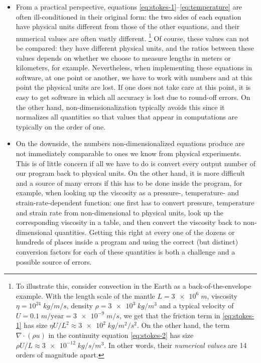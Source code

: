 \documentclass{article}
\begin{document}
\begin{itemize}
  \item From a practical perspective, equations
  \eqref{eq:stokes-1}--\eqref{eq:temperature} are often ill-conditioned in
  their original form: the two sides of each equation have physical units
  different from those of the other equations, and their numerical values are
  often vastly different.%
  \footnote{To illustrate this, consider convection in the Earth as a
  back-of-the-envelope example.
  With the length scale of the mantle $L=\num{3e6}\;\si{m}$, viscosity
  $\eta=10^{24} \; \si{kg}/\si{m}/\si{s}$, density $\rho=\num{3e3} \; \si{kg}/\si{m}^3$ and a typical
  velocity of $U=0.1\;\si{m}/\text{year}=\num{3e-9}\; \si{m}/\si{s}$, we get that the friction
  term in \eqref{eq:stokes-1} has size $\eta U/L^2 \approx \num{3e2} \;
  \si{kg}/\si{m}^2/\si{s}^2$. On the other hand, the term $\nabla\cdot(\rho u)$ in the
  continuity equation \eqref{eq:stokes-2} has size $\rho U/L\approx \num{3e-12} \; \si{kg}/\si{s}/\si{m}^3$. In other words, their \textit{numerical values} are 14
  orders of magnitude apart.}
  Of course, these values can not be compared: they have different physical
  units, and the ratios between these values depends on whether we choose to
  measure lengths in meters or kilometers, for example. Nevertheless, when
  implementing these equations in software, at one point or another, we have to
  work with numbers and at this point the physical units are lost. If one does
  not take care at this point, it is easy to get software in which all accuracy
  is lost due to round-off errors. On the other hand, non-dimensionalization
  typically avoids this since it normalizes all quantities so that values that
  appear in computations are typically on the order of one.

  \item On the downside, the numbers non-dimensionalized equations produce are
  not immediately comparable to ones we know from physical experiments. This is
  of little concern if all we have to do is convert every output number of our
  program back to physical units. On the other hand, it is more difficult and a
  source of many errors if this has to be done inside the program, for example,
  when looking up the viscosity as a pressure-, temperature- and
  strain-rate-dependent function: one first has to convert pressure,
  temperature and strain rate from non-dimensional to physical units, look up
  the corresponding viscosity in a table, and then convert the viscosity back to
  non-dimensional quantities. Getting this right at every one of the dozens or
  hundreds of places inside a program and using the correct (but distinct)
  conversion factors for each of these quantities is both a challenge and a possible source
  of errors.


\end{itemize}
\end{document}
